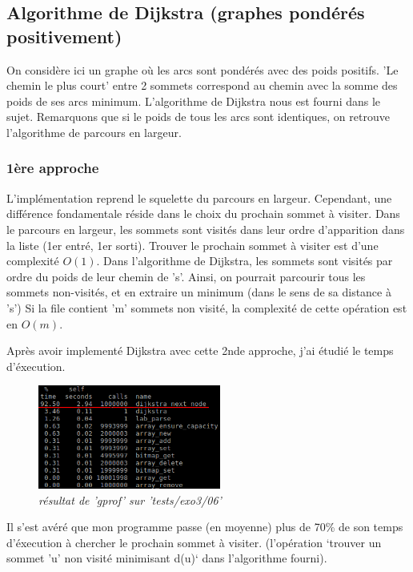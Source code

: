 \documentclass[10pt]{article}
\begin{document}
		\subsection{Algorithme de Dijkstra (graphes pondérés positivement)}
			On considère ici un graphe où les arcs sont pondérés avec des poids positifs.\newline
			'Le chemin le plus court' entre 2 sommets correspond au chemin avec la somme des poids de ses arcs minimum.\newline
			L'algorithme de Dijkstra nous est fourni dans le sujet. Remarquons que si le poids de tous les arcs sont identiques,
			on retrouve l'algorithme de parcours en largeur.
			\subsubsection{1ère approche}
				L'implémentation reprend le squelette du parcours en largeur.
				Cependant, une différence fondamentale réside dans le choix du prochain sommet à visiter.
				Dans le parcours en largeur, les sommets sont visités dans leur ordre d'apparition dans la liste (1er entré, 1er sorti).
				Trouver le prochain sommet à visiter est d'une complexité \(O(1)\).
				Dans l'algorithme de Dijkstra, les sommets sont visités par ordre du poids de leur chemin de 's'.
				Ainsi, on pourrait parcourir tous les sommets non-visités, et en extraire un minimum (dans le sens de sa distance à 's')
				Si la file contient 'm' sommets non visité, la complexité de cette opération est en \(O(m)\).
				
				Après avoir implementé Dijkstra avec cette 2nde approche, j'ai étudié le temps d'éxecution.
				\begin{figure}[H]
					\begin{center}
						\includegraphics[width=6cm,height=\textheight,keepaspectratio]{./images/no_pqueue.png}
					\end{center}
				    \caption{\textit{résultat de 'gprof' sur 'tests/exo3/06'}}
				\end{figure}
				Il s'est avéré que mon programme passe (en moyenne) plus de 70\% de
				son temps d'éxecution à chercher le prochain sommet à visiter.
				(l'opération `trouver un sommet 'u' non visité minimisant d(u)` dans l'algorithme fourni).\newline
\end{document}
